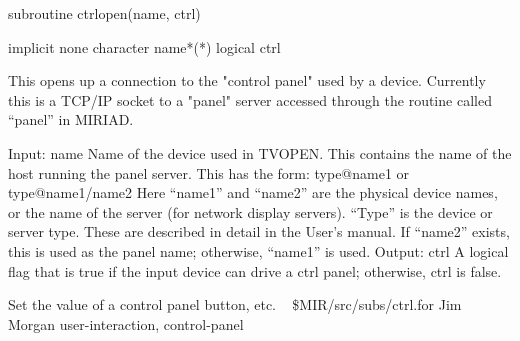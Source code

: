 \par{\tenpoint
{\eightpoint\begintt
      subroutine ctrlopen(name, ctrl)

      implicit none
      character name*(*)
      logical ctrl

  This opens up a connection to the "control panel" used by a device.
  Currently this is a TCP/IP socket to a "panel" server accessed
  through the routine called ``panel'' in MIRIAD.

  Input:
    name       Name of the device used in TVOPEN.  This contains
               the name of the host running the panel server.
               This has the form:
                 type@name1  or  type@name1/name2
               Here ``name1'' and ``name2'' are the physical device
               names, or the name of the server (for network display
               servers).  ``Type'' is the device or server type.
               These are described in detail in the User's manual.
               If ``name2'' exists, this is used as the panel name;
               otherwise, ``name1'' is used.
  Output:
    ctrl       A logical flag that is true if the input device can
               drive a ctrl panel; otherwise, ctrl is false.
\endtt}
\par}
%
\noindent Set the value of a control panel button, etc.
\newline \ 
\newline {} \$MIR/src/subs/ctrl.for
\newline {} Jim Morgan
\newline {} user-interaction, control-panel
